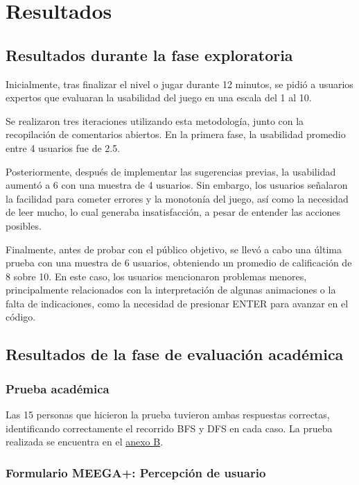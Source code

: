 \chapter{Resultados}

\section{Resultados durante la fase exploratoria}

Inicialmente, tras finalizar el nivel o jugar durante 12 minutos, se pidió a usuarios expertos que evaluaran la usabilidad del juego en una escala del 1 al 10.

Se realizaron tres iteraciones utilizando esta metodología, junto con la recopilación de comentarios abiertos. En la primera fase, la usabilidad promedio entre 4 usuarios fue de 2.5.

Posteriormente, después de implementar las sugerencias previas, la usabilidad aumentó a 6 con una muestra de 4 usuarios. Sin embargo, los usuarios señalaron la facilidad para cometer errores y la monotonía del juego, así como la necesidad de leer mucho, lo cual generaba insatisfacción, a pesar de entender las acciones posibles.

Finalmente, antes de probar con el público objetivo, se llevó a cabo una última prueba con una muestra de 6 usuarios, obteniendo un promedio de calificación de 8 sobre 10. En este caso, los usuarios mencionaron problemas menores, principalmente relacionados con la interpretación de algunas animaciones o la falta de indicaciones, como la necesidad de presionar ENTER para avanzar en el código.

\section{Resultados de la fase de evaluación académica}

\subsection{Prueba académica}

Las 15 personas que hicieron la prueba tuvieron ambas respuestas correctas, identificando correctamente el recorrido BFS y DFS en cada caso. La prueba realizada se encuentra en el \hyperref[AnexoB]{anexo B}.

\subsection{Formulario MEEGA+: Percepción de usuario}

